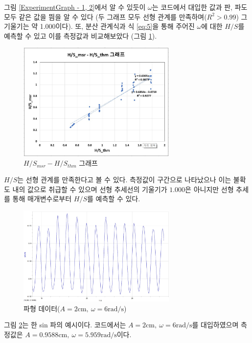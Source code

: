 그림 \ref{ExperimentGraph - 1, 2}에서 알 수 있듯이 $\omega$는 코드에서 대입한 값과 판, 파도 모두 같은 값을 띔을 알 수 있다 (두 그래프 모두 선형 관계를 만족하며($R^2 > 0.99$) 그 기울기는 약 1.000이다). 또, 분산 관계식과 식 \ref{eq:5}을 통해 주어진 $\omega$에 대한 $H/S$를 예측할 수 있고 이를 측정값과 비교해보았다 (그림 \ref{H/S Graph}).

\begin{figure}[H]
    \centering
    \includegraphics[width=0.70\textwidth]{images/Experiment(H.S_thm-H.S_msr).jpg}
    \caption{$H/S_{msr} - H/S_{thm}$ 그래프}
    \label{H/S Graph}
\end{figure}

$H/S$는 선형 관계를 만족한다고 볼 수 있다. 측정값이 구간으로 나타났으나 이는 불확도 내의 값으로 취급할 수 있으며 선형 추세선의 기울기가 $1.000$은 아니지만 선형 추세를 통해 매개변수로부터 $H/S$를 예측할 수 있다.

\begin{figure}[H]
    \centering
    \includegraphics[width=0.70\textwidth]{images/Wave(omega=6,A=2).jpg}
    \caption{파형 데이터($A=2\mathrm{cm},~\omega=6\mathrm{rad/s}$)}
    \label{Example Wave Data}
\end{figure}

그림 \ref{Example Wave Data}는 한 sin 파의 예시이다. 코드에서는 $A=2\mathrm{cm},~\omega=6\mathrm{rad/s}$를 대입하였으며 측정값은 $A=0.9588\mathrm{cm},~\omega=5.959\mathrm{rad/s}$이다. 


